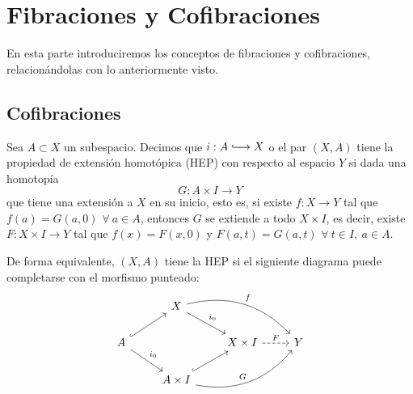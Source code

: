 \chapter{Fibraciones y Cofibraciones}
En esta parte introduciremos los conceptos de fibraciones y cofibraciones, relacionándolas con lo anteriormente visto.
\section{Cofibraciones}
\begin{defin}
Sea $A \subset X$ un subespacio. Decimos que $i : A \longhookrightarrow X$ o el par $(X, A)$ tiene la propiedad de extensión homotópica (HEP) con respecto al espacio $Y$ si dada una homotopía
\[ G : A \times I \longrightarrow Y \]
que tiene una extensión a $X$ en su inicio, esto es, si existe $f: X \longrightarrow Y $ tal que $f(a) = G(a, 0)$ $\forall \ a \in A$, entonces $G$ se extiende a todo $X \times I$, es decir, existe $F : X \times I \longrightarrow Y$ tal que $f(x) = F(x,0)$ y $F(a,t) = G(a, t)$ $\forall \ t \in I, \ a \in A$. \par 
De forma equivalente, $(X,A)$ tiene la HEP si el siguiente diagrama puede completarse con el morfismo punteado:
\[
\begin{tikzcd}
	{} 						  & X \drar{i_0} \arrow[bend left]{drr}{f}			   &        					&   \\
	A \urar[hook] \drar{i_0}  &   												   & X \times I \rar[dashed]{F} & Y \\
	   						  & A \times I  \urar[hook] \arrow[bend right]{urr}{G} &   							&
\end{tikzcd}
\]
\end{defin}
